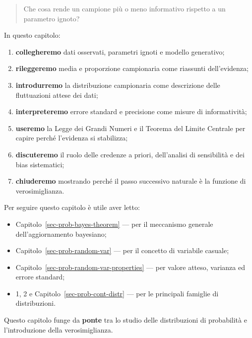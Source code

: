 \documentclass[
  italian,
  letterpaper,
  a4paper,
  11pt,
  open=any]{scrbook}
\providecommand{\tightlist}{%
  \setlength{\itemsep}{0pt}\setlength{\parskip}{0pt}}
\theoremstyle{plain}
\theoremstyle{definition}
\theoremstyle{definition}
\theoremstyle{remark}
\begin{document}
\begin{quote}
Che cosa rende un campione più o meno informativo rispetto a un
parametro ignoto?
\end{quote}

In questo capitolo:

\begin{enumerate}
\def\labelenumi{\arabic{enumi}.}
\tightlist
\item
  \textbf{collegheremo} dati osservati, parametri ignoti e modello
  generativo;
\item
  \textbf{rileggeremo} media e proporzione campionaria come riassunti
  dell'evidenza;
\item
  \textbf{introdurremo} la distribuzione campionaria come descrizione
  delle fluttuazioni attese dei dati;
\item
  \textbf{interpreteremo} errore standard e precisione come misure di
  informatività;
\item
  \textbf{useremo} la Legge dei Grandi Numeri e il Teorema del Limite
  Centrale per capire perché l'evidenza si stabilizza;
\item
  \textbf{discuteremo} il ruolo delle credenze a priori, dell'analisi di
  sensibilità e dei bias sistematici;
\item
  \textbf{chiuderemo} mostrando perché il passo successivo naturale è la
  funzione di verosimiglianza.
\end{enumerate}

\begin{tcolorbox}[enhanced jigsaw, arc=.35mm, bottomrule=.15mm, bottomtitle=1mm, breakable, colback=white, colbacktitle=quarto-callout-tip-color!10!white, colframe=quarto-callout-tip-color-frame, coltitle=black, left=2mm, leftrule=.75mm, opacityback=0, opacitybacktitle=0.6, rightrule=.15mm, title=\textcolor{quarto-callout-tip-color}{\faLightbulb}\hspace{0.5em}{Prerequisiti}, titlerule=0mm, toprule=.15mm, toptitle=1mm]

Per seguire questo capitolo è utile aver letto:

\begin{itemize}
\tightlist
\item
  Capitolo~\ref{sec-prob-bayes-theorem} --- per il meccanismo generale
  dell'aggiornamento bayesiano;
\item
  Capitolo~\ref{sec-prob-random-var} --- per il concetto di variabile
  casuale;
\item
  Capitolo~\ref{sec-prob-random-var-properties} --- per valore atteso,
  varianza ed errore standard;
\item
  1, 2 e Capitolo~\ref{sec-prob-cont-distr} --- per le principali
  famiglie di distribuzioni.
\end{itemize}

Questo capitolo funge da \textbf{ponte} tra lo studio delle
distribuzioni di probabilità e l'introduzione della verosimiglianza.

\end{tcolorbox}
\end{document}
